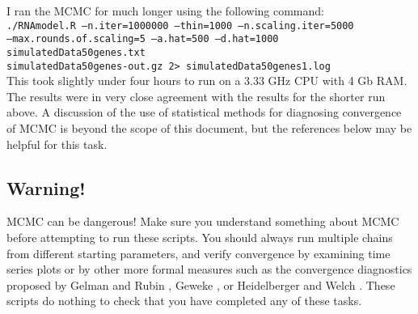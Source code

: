 \documentclass[12pt,]{article}
\begin{document}
I ran the MCMC for much longer using the following command: \\
{\tt ./RNAmodel.R --n.iter=1000000 --thin=1000 --n.scaling.iter=5000 \\
--max.rounds.of.scaling=5 --a.hat=500 --d.hat=1000  simulatedData50genes.txt 
\\ simulatedData50genes-out.gz 2> simulatedData50genes1.log}\\
This took slightly under four hours to run on a 3.33 GHz CPU with 4 Gb RAM. The
results were in very close agreement with the results for the shorter run above.
A discussion of the use of statistical methods for diagnosing convergence of
MCMC is beyond the scope of this document, but the references below may
be helpful for this task.


\subsection{Warning!}
MCMC can be dangerous! Make sure you understand something about MCMC before
attempting to run these scripts. You should always run multiple chains from different
starting parameters, and verify convergence by examining time series plots or by other
more formal measures such as the convergence diagnostics proposed by Gelman and 
Rubin \cite{gelman_inference_1992}, 
Geweke \cite{geweke_evaluating_1992}, 
or Heidelberger and Welch 
\cite{heidelberger_simulation_1983}. 
These scripts do nothing to check that you have 
completed any of these tasks.



\end{document}
